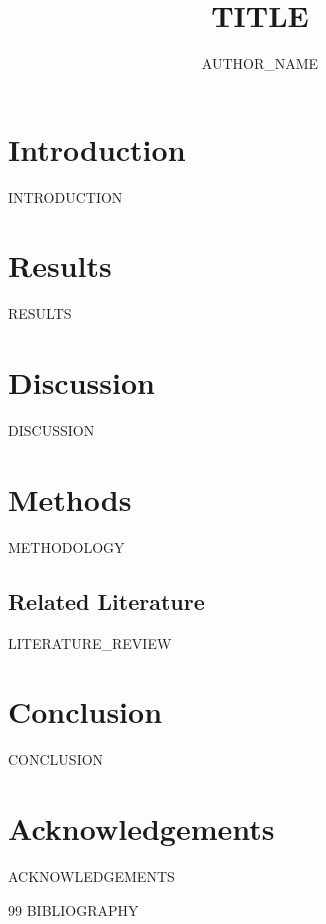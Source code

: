 \documentclass[fleqn,10pt]{wlscirep}
\title{{{TITLE}}}
\author[1,*]{{{AUTHOR_NAME}}}
\affil[1]{{{AUTHOR_AFFILIATION}}}
\affil[*]{Correspondence: contact@freedomlabs.in}
\begin{document}
\flushbottom
\maketitle
\thispagestyle{empty}

\section*{Introduction}
{{INTRODUCTION}}

\section*{Results}
{{RESULTS}}

\section*{Discussion}
{{DISCUSSION}}

\section*{Methods}
{{METHODOLOGY}}

\subsection*{Related Literature}
{{LITERATURE_REVIEW}}

\section*{Conclusion}
{{CONCLUSION}}

\section*{Acknowledgements}
{{ACKNOWLEDGEMENTS}}


\begin{thebibliography}{99}
{{BIBLIOGRAPHY}}
\end{thebibliography}
\end{document}
